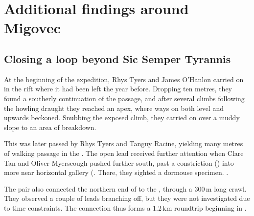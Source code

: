 \section{Additional findings around Migovec}


\subsection{Closing a loop beyond Sic Semper Tyrannis}
At the beginning of the expedition, Rhys Tyers and James O'Hanlon carried on in the  rift where it had been left the year before. Dropping ten metres, they found a southerly continuation of the passage, and after several climbs following the howling draught they reached an apex, where ways on both level and upwards beckoned. Snubbing the exposed climb, they carried on over a muddy slope to an area of breakdown. 

This was later passed by Rhys Tyers and Tanguy Racine, yielding many metres of walking passage in the . The open lead received further attention when Clare Tan and Oliver Myerscough pushed further south, past a constriction () into more near horizontal gallery (. There, they sighted a dormouse specimen. .

The pair also connected the northern end of  to the , through a 300\,m long crawl. They observed a couple of leads branching off, but they were not investigated due to time constraints. The connection thus forms a 1.2\,km roundtrip beginning in .

